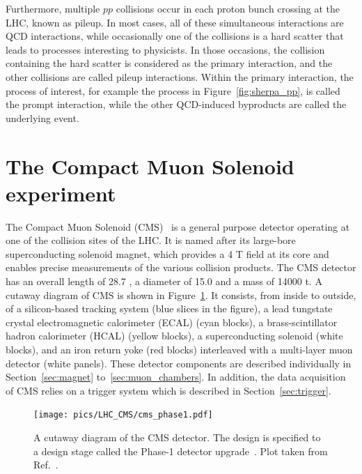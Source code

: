 Furthermore, multiple $pp$ collisions occur in each proton bunch crossing at the LHC, known as pileup.
In most cases, all of these simultaneous interactions are QCD interactions, 
while occasionally one of the collisions is a hard scatter that leads to processes interesting to physicists.
In those occasions, the collision containing the hard scatter is considered as the primary interaction, 
and the other collisions are called pileup interactions.
Within the primary interaction, the process of interest, for example the \ttH process in Figure~\ref{fig:sherpa_pp},
is called the prompt interaction, while the other QCD-induced byproducts are called the underlying event.




\section{The Compact Muon Solenoid experiment}\label{sec:cms}


The Compact Muon Solenoid (CMS)~\cite{Collaboration_2008} is a general purpose detector operating at one of the collision sites of the LHC.
It is named after its large-bore superconducting solenoid magnet, 
which provides a 4 T field at its core and enables precise measurements of the various collision products.
The CMS detector has an overall length of 28.7 \meter, a diameter of 15.0 \meter and a mass of 14000 t.
A cutaway diagram of CMS is shown in Figure~\ref{fig:cms_detector}.
It consists, from inside to outside, of a silicon-based tracking system (blue slices in the figure), 
a lead tungstate crystal electromagnetic calorimeter (ECAL) (cyan blocks),
a brass-scintillator hadron calorimeter (HCAL) (yellow blocks),
a superconducting solenoid (white blocks), 
and an iron return yoke (red blocks) interleaved with a multi-layer muon detector (white panels).
These detector components are described individually in Section~\ref{sec:magnet} to~\ref{sec:muon_chambers}.
In addition, the data acquisition of CMS relies on a trigger system which is described in Section~\ref{sec:trigger}.

\begin{figure}[!htb]
    \centering
    \captionsetup{justification=justified}
    \texttt{[image: pics/LHC\_CMS/cms\_phase1.pdf]}
    \caption{A cutaway diagram of the CMS detector. 
             The design is specified to a design stage called the Phase-1 detector upgrade~\cite{arXiv:2012.14304, Mans:1481837,Tapper:1556311}.
             Plot taken from Ref.~\cite{Sakuma:2665537}.}
    \label{fig:cms_detector}
\end{figure}

